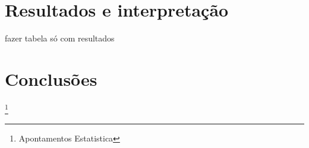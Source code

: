 \section{Resultados e interpretação}\label{Resultados}
fazer tabela só com resultados\\
\section{Conclusões}\label{Conclusão}


%
%
%
\listoffigures
\cite{*}

\footnote{Apontamentos Estatistica}

